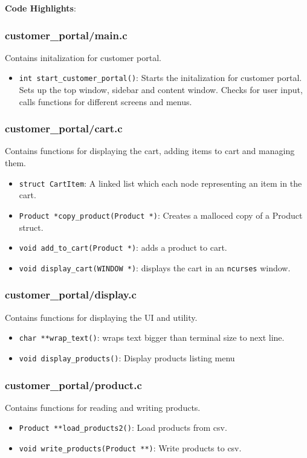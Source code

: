 \documentclass[12pt,a4paper]{article}
\begin{document}
\textbf{Code Highlights}:
\subsubsection{customer\_portal/main.c}
Contains initalization for customer portal.
\begin{itemize}
    \item \texttt{int start\_customer\_portal()}: Starts the initalization for customer portal. Sets up the top window, sidebar and content window. Checks for user input, calls functions for different screens and menus.
\end{itemize}

\subsubsection{customer\_portal/cart.c}
Contains functions for displaying the cart, adding items to cart and managing them.
\begin{itemize}
    \item \texttt{struct CartItem}: A linked list which each node representing an item in the cart.
    \item \texttt{Product *copy\_product(Product *)}: Creates a malloced copy of a Product struct.
    \item \texttt{void add\_to\_cart(Product *)}: adds a product to cart.
    \item \texttt{void display\_cart(WINDOW *)}: displays the cart in an \texttt{ncurses} window.
\end{itemize}

\subsubsection{customer\_portal/display.c}
Contains functions for displaying the UI and utility.
\begin{itemize}
    \item \texttt{char **wrap\_text()}: wraps text bigger than terminal size to next line.
    \item \texttt{void display\_products()}: Display products listing menu
\end{itemize}

\subsubsection{customer\_portal/product.c}
Contains functions for reading and writing products.
\begin{itemize}
    \item \texttt{Product **load\_products2()}: Load products from csv.
    \item \texttt{void write\_products(Product **)}: Write products to csv.
\end{itemize}
\end{document}
